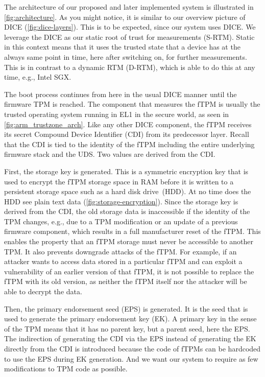 The architecture of our proposed and later implemented system is illustrated in \autoref{fig:architecture}.
As you might notice, it is similar to our overview picture of DICE (\autoref{fig:dice-layers}).
This is to be expected, since our system uses DICE\@.
We leverage the DICE as our static root of trust for measurements (S-RTM).
Static in this context means that it uses the trusted state that a device has at the always same point in time, here after switching on, for further measurements.
This is in contrast to a dynamic RTM (D-RTM), which is able to do this at any time, e.g., Intel SGX\@.

The boot process continues from here in the usual DICE manner until the firmware TPM is reached.
The component that measures the fTPM is usually the trusted operating system running in EL1 in the secure world, as seen in \autoref{fig:arm_trustzone_arch}.
Like any other DICE component, the fTPM receives its secret Compound Device Identifier (CDI) from its predecessor layer.
Recall that the CDI is tied to the identity of the fTPM including the entire underlying firmware stack and the UDS\@.
Two values are derived from the CDI\@.


First, the storage key is generated.
This is a symmetric encryption key that is used to encrypt the fTPM storage space in RAM before it is written to a persistent storage space such as a hard disk drive~(HDD).
At no time does the HDD see plain text data (\autoref{fig:storage-encryption}).
Since the storage key is derived from the CDI, the old storage data is inaccessible if the identity of the TPM changes, e.g., due to a TPM modification or an update of a previous firmware component, which results in a full manufacturer reset of the fTPM\@.
This enables the property that an fTPM storage must never be accessible to another TPM\@.
It also prevents downgrade attacks of the fTPM\@.
For example, if an attacker wants to access data stored in a particular fTPM and can exploit a vulnerability of an earlier version of that fTPM, it is not possible to replace the fTPM with its old version, as neither the fTPM itself nor the attacker will be able to decrypt the data.




Then, the primary endorsement seed (EPS) is generated.
It is the seed that is used to generate the primary endorsement key (EK).
A primary key in the sense of the TPM means that it has no parent key, but a parent seed, here the EPS\@.
The indirection of generating the CDI via the EPS instead of generating the EK directly from the CDI is introduced because the code of fTPMs can be hardcoded to use the EPS during EK generation.
And we want our system to require as few modifications to TPM code as possible.

